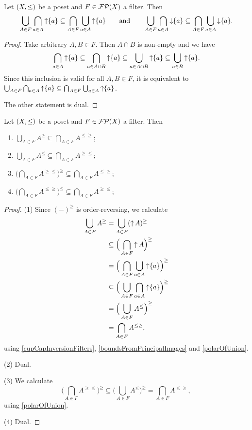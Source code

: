 \begin{lemma} \label{cupCapInversionFilters}
Let $\sSet{X,\leq}$ be a poset and $F\in \operatorname{\mathcal{FP}}(X)$ a filter. Then
\[ \bigcup_{A\in F}\bigcap_{a\in A}\operatorname{\uparrow}\{a\} \subseteq \bigcap_{A\in F}\bigcup_{a\in A}\operatorname{\uparrow}\{a\} \qquad\text{and}\qquad \bigcup_{A\in F}\bigcap_{a\in A}\operatorname{\downarrow}\{a\} \subseteq \bigcap_{A\in F}\bigcup_{a\in A}\operatorname{\downarrow}\{a\}. \]
\end{lemma}
\begin{proof}
Take arbitrary $A,B\in F$. Then $A\cap B$ is non-empty and we have
\[ \bigcap_{a\in A}\operatorname{\uparrow} \{a\} \subseteq \bigcap_{a\in A\cap B}\operatorname{\uparrow} \{a\} \subseteq \bigcup_{a\in A\cap B}\operatorname{\uparrow} \{a\} \subseteq \bigcup_{a\in B}\operatorname{\uparrow} \{a\}. \]
Since this inclusion is valid for all $A,B\in F$, it is equivalent to $\bigcup_{A\in F}\bigcap_{a\in A}\operatorname{\uparrow}\{a\} \subseteq \bigcap_{A\in F}\bigcup_{a\in A}\operatorname{\uparrow}\{a\}$.

The other statement is dual.
\end{proof}
\begin{corollary} \label{boundsInFilterInclusion}
Let $\sSet{X,\leq}$ be a poset and $F\in \operatorname{\mathcal{FP}}(X)$ a filter. Then
\begin{enumerate}
\item $\bigcup_{A\in F}A^\geq \subseteq \bigcap_{A\in F}A^{\leq\geq}$;
\item $\bigcup_{A\in F}A^\leq \subseteq \bigcap_{A\in F}A^{\geq\leq}$;
\item $\Big(\bigcap_{A\in F}A^{\geq\leq}\Big)^\geq \subseteq \bigcap_{A\in F}A^{\leq\geq}$;
\item $\Big(\bigcap_{A\in F}A^{\leq\geq}\Big)^\leq \subseteq \bigcap_{A\in F}A^{\geq\leq}$;
\end{enumerate}
\end{corollary}
\begin{proof}
(1) Since $(-)^\geq$ is order-reversing, we calculate
\begin{align*}
\bigcup_{A\in F}A^\geq &= \bigcup_{A\in F}(\operatorname{\uparrow} A)^\geq \\
&\subseteq \Big(\bigcap_{A\in F} \operatorname{\uparrow} A\Big)^\geq \\
&= \Big(\bigcap_{A\in F} \bigcup_{a\in A} \operatorname{\uparrow} \{a\}\Big)^\geq \\
&\subseteq \Big(\bigcup_{A\in F} \bigcap_{a\in A} \operatorname{\uparrow} \{a\}\Big)^\geq \\
&= \Big(\bigcup_{A\in F} A^\leq\Big)^\geq \\
&= \bigcap_{A\in F}A^{\leq\geq},
\end{align*}
using \ref{cupCapInversionFilters}, \ref{boundsFromPrincipalImages} and \ref{polarOfUnion}.

(2) Dual.

(3) We calculate
\[ \Big(\bigcap_{A\in F}A^{\geq\leq}\Big)^\geq \subseteq \Big(\bigcup_{A\in F}A^{\leq}\Big)^\geq = \bigcap_{A\in F}A^{\leq\geq}, \]
using \ref{polarOfUnion}.

(4) Dual.
\end{proof}

